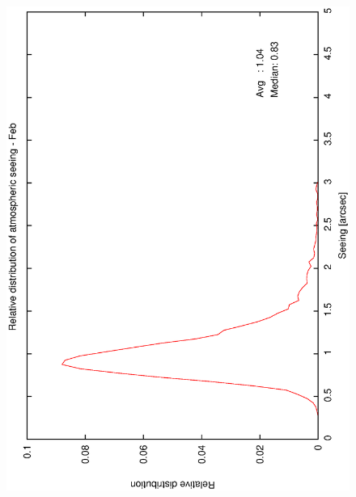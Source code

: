 {{\begin{figure}[htbp]
\begin{center}
{   \includegraphics[scale=0.25, angle=-90]{figures/ecs/corr_see_dist_feb.eps}
  }
 \subfigure[] {
   \label{fig:see_dist_mar}
}
\end{center}
\end{figure}}}
